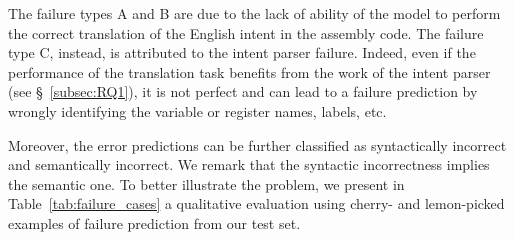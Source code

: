 The failure types A and B are due to the lack of ability of the model to perform the correct translation of the English intent in the assembly code. The failure type C, instead, is attributed to the intent parser failure. Indeed, even if the performance of the translation task benefits from the work of the intent parser (see \S{}~\ref{subsec:RQ1}), it is not perfect and can lead to a failure prediction by wrongly identifying the variable or register names, labels, etc. 

Moreover, the error predictions can be further classified as syntactically incorrect and semantically incorrect. We remark that the syntactic incorrectness implies the semantic one.
To better illustrate the problem, we present in Table~\ref{tab:failure_cases} a qualitative evaluation using cherry- and lemon-picked examples of failure prediction from our test set.

